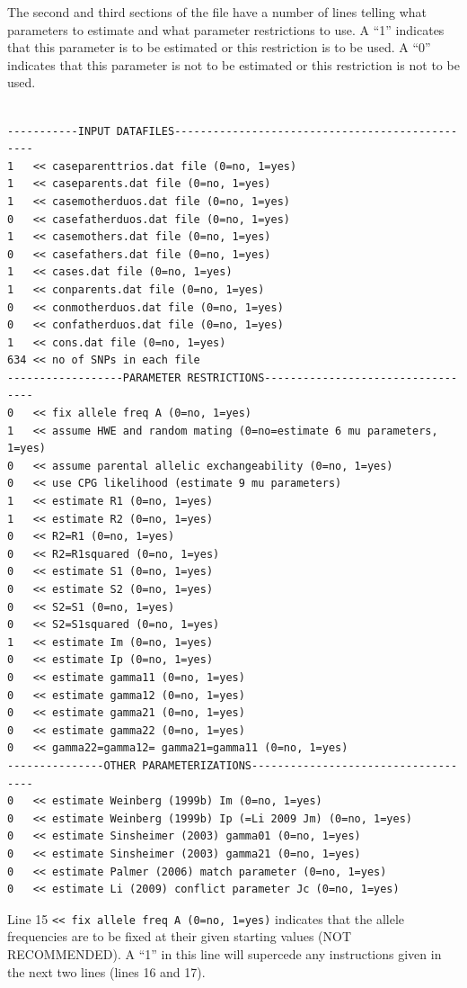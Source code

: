 \documentclass[a4paper,12pt]{article}
\newcommand{\code}[1]{{\footnotesize{{\tt #1}}}}
\begin{document}
The second and third sections of the file have a number of lines telling what parameters to estimate and what parameter restrictions to use. A ``1'' indicates that this parameter is to be estimated or this restriction is to be used. A ``0'' indicates that this parameter is not to be estimated or this restriction is not to be used. 
\vspace{0.35cm} \begin{lstlisting}

-----------INPUT DATAFILES------------------------------------------------
1   << caseparenttrios.dat file (0=no, 1=yes)
1   << caseparents.dat file (0=no, 1=yes)
1   << casemotherduos.dat file (0=no, 1=yes)
0   << casefatherduos.dat file (0=no, 1=yes)
1   << casemothers.dat file (0=no, 1=yes)
0   << casefathers.dat file (0=no, 1=yes)
1   << cases.dat file (0=no, 1=yes)
1   << conparents.dat file (0=no, 1=yes)
0   << conmotherduos.dat file (0=no, 1=yes)
0   << confatherduos.dat file (0=no, 1=yes)
1   << cons.dat file (0=no, 1=yes)
634 << no of SNPs in each file
------------------PARAMETER RESTRICTIONS----------------------------------
0   << fix allele freq A (0=no, 1=yes)
1   << assume HWE and random mating (0=no=estimate 6 mu parameters, 1=yes)
0   << assume parental allelic exchangeability (0=no, 1=yes)
0   << use CPG likelihood (estimate 9 mu parameters)
1   << estimate R1 (0=no, 1=yes)
1   << estimate R2 (0=no, 1=yes)
0   << R2=R1 (0=no, 1=yes)
0   << R2=R1squared (0=no, 1=yes)
0   << estimate S1 (0=no, 1=yes)    
0   << estimate S2 (0=no, 1=yes)
0   << S2=S1 (0=no, 1=yes)
0   << S2=S1squared (0=no, 1=yes)
1   << estimate Im (0=no, 1=yes)
0   << estimate Ip (0=no, 1=yes)
0   << estimate gamma11 (0=no, 1=yes)
0   << estimate gamma12 (0=no, 1=yes)
0   << estimate gamma21 (0=no, 1=yes)
0   << estimate gamma22 (0=no, 1=yes)
0   << gamma22=gamma12= gamma21=gamma11 (0=no, 1=yes)
---------------OTHER PARAMETERIZATIONS------------------------------------
0   << estimate Weinberg (1999b) Im (0=no, 1=yes)
0   << estimate Weinberg (1999b) Ip (=Li 2009 Jm) (0=no, 1=yes)
0   << estimate Sinsheimer (2003) gamma01 (0=no, 1=yes)
0   << estimate Sinsheimer (2003) gamma21 (0=no, 1=yes)
0   << estimate Palmer (2006) match parameter (0=no, 1=yes)
0   << estimate Li (2009) conflict parameter Jc (0=no, 1=yes)

\end{lstlisting} \vspace{0.35cm}
Line 15 \code{<< fix allele freq A (0=no, 1=yes)} indicates that the allele frequencies are to be fixed at their given starting values (NOT RECOMMENDED). A ``1'' in this line will supercede any instructions given in the next two lines (lines 16 and 17). 
\end{document}
